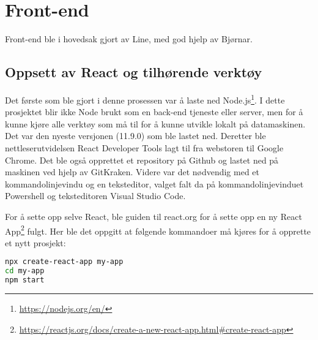 





\clearpage

%

\section{Front-end}
Front-end ble i hovedsak gjort av Line, med god hjelp av Bjørnar. 

\subsection{Oppsett av React og tilhørende verktøy}

Det første som ble gjort i denne prosessen var å laste ned Node.js\footnote{\url{https://nodejs.org/en/}}. I dette prosjektet blir ikke Node brukt som en back-end tjeneste eller server, men for å kunne kjøre alle verktøy som må til for å kunne utvikle lokalt på datamaskinen. Det var den nyeste versjonen (11.9.0) som ble lastet ned. Deretter ble nettleserutvidelsen React Developer Tools lagt til fra  webstoren til Google Chrome. Det ble også opprettet et repository på Github og lastet ned på maskinen ved hjelp av GitKraken. 
Videre var det nødvendig med et kommandolinjevindu og en teksteditor, valget falt da på kommandolinjevinduet Powershell og teksteditoren Visual Studio Code.

For å sette opp selve React, ble  guiden til react.org for å sette opp en ny React App\footnote{\url{https://reactjs.org/docs/create-a-new-react-app.html\#create-react-app}} fulgt. Her ble det oppgitt at følgende kommandoer må kjøres for å opprette et nytt prosjekt:
\begin{lstlisting}[caption={Oppretting av React App},language=bash]
npx create-react-app my-app
cd my-app
npm start
\end{lstlisting}

